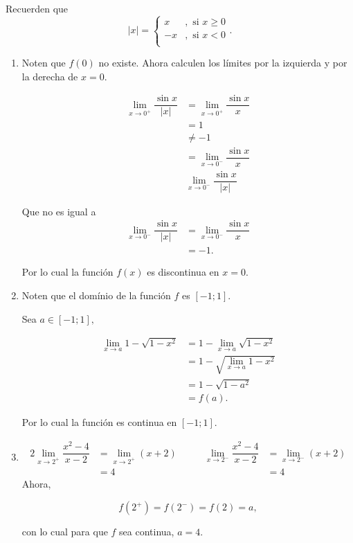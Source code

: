 Recuerden que
\[
\left|x\right|=\begin{cases}
x &, \text{ si }x\geq0\\
-x &, \text{ si }x<0\\
\end{cases}.
\]

\begin{example}
	\begin{enumerate}
		\item Noten que \(f(0)\) no existe. Ahora calculen los l\'imites por la izquierda y por la derecha de \(x=0.\)
		
		\begin{align*}
		\lim\limits_{x\to 0^+}\dfrac{\sin x}{\left|x\right|}&=\lim\limits_{x\to 0^+}\dfrac{\sin x}{x}\\
		&=1\\
		&\neq -1\\
		&=\lim\limits_{x\to 0^-}\dfrac{\sin x}{x}\\
		&\lim\limits_{x\to 0^-}\dfrac{\sin x}{\left|x\right|}
		\end{align*}
		
		 Que no es igual a 
		 \begin{align*}
		 \lim\limits_{x\to 0^-}\dfrac{\sin x}{\left|x\right|}&=\lim\limits_{x\to 0^-}\dfrac{\sin x}{x}\\
		 &=-1.
		 \end{align*}
		 
		 Por lo cual la funci\'on \(f(x)\) es discontinua en \(x=0.\)
		 
		 \item Noten que el dom\'inio de la funci\'on \(f\) es \([-1;1].\)\newline
		 
		 Sea \(a\in[-1;1],\)
		 
		 \begin{align*}
		 \lim\limits_{x\to a}{1-\sqrt{1-x^2}}&=1-\lim\limits_{x\to a}\sqrt{1-x^2}\\
		 &=1-\sqrt{\lim\limits_{x\to a}1-x^2}\\
		 &=1-\sqrt{1-a^2}\\
		 &=f(a).
		 \end{align*}
		 
		 Por lo cual la funci\'on es continua en \([-1;1].\)
		 
		 \item \begin{alignat*}{2}
		 \lim\limits_{x\to 2^+}\dfrac{x^2-4}{x-2}&=\lim\limits_{x\to 2^+}(x+2)	&\qquad \lim\limits_{x\to 2^-}\dfrac{x^2-4}{x-2}&=\lim\limits_{x\to 2^-}(x+2)\\
		 &=4 &\qquad &=4
		 \end{alignat*}
		 Ahora, 
		 
		 \[
		 f(2^+)=f(2^-)=f(2)=a,
		 \]
		 
		 con lo cual para que \(f\) sea continua, \(a=4.\)
	\end{enumerate}
\end{example}


